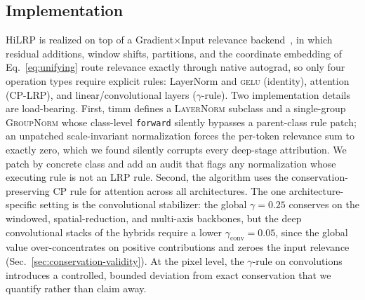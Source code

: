 \documentclass[lettersize,journal]{IEEEtran}
\begin{document}
\subsection{Implementation}
\label{sec:implementation}
HiLRP is realized on top of a Gradient$\times$Input relevance backend~\cite{achtibat2024attnlrp}, in which residual additions, window shifts, partitions, and the coordinate embedding of Eq.~\eqref{eq:unifying} route relevance exactly through native autograd, so only four operation types require explicit rules: LayerNorm and \textsc{gelu} (identity), attention (CP-LRP), and linear/convolutional layers ($\gamma$-rule). Two implementation details are load-bearing. First, timm defines a \textsc{LayerNorm} subclass and a single-group \textsc{GroupNorm} whose class-level \texttt{forward} silently bypasses a parent-class rule patch; an unpatched scale-invariant normalization forces the per-token relevance sum to exactly zero, which we found silently corrupts every deep-stage attribution. We patch by concrete class and add an audit that flags any normalization whose executing rule is not an LRP rule. Second, the algorithm uses the conservation-preserving CP rule for attention across all architectures. The one architecture-specific setting is the convolutional stabilizer: the global $\gamma{=}0.25$ conserves on the windowed, spatial-reduction, and multi-axis backbones, but the deep convolutional stacks of the hybrids require a lower $\gamma_{\text{conv}}{=}0.05$, since the global value over-concentrates on positive contributions and zeroes the input relevance (Sec.~\ref{sec:conservation-validity}). At the pixel level, the $\gamma$-rule on convolutions introduces a controlled, bounded deviation from exact conservation that we quantify rather than claim away.
\end{document}

